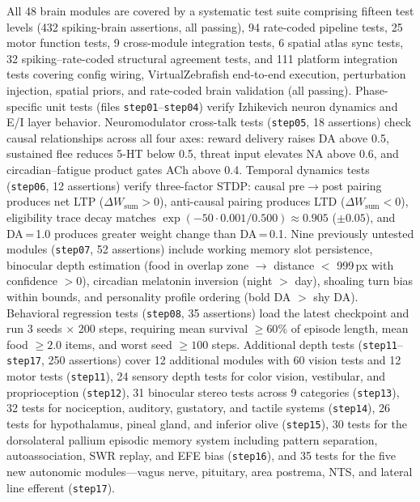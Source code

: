\documentclass[12pt]{article}
\begin{document}
All 48 brain modules are covered by a systematic test suite comprising
fifteen test levels (432 spiking-brain assertions, all passing),
94 rate-coded pipeline tests, 25 motor function tests,
9 cross-module integration tests, 6 spatial atlas sync tests,
32 spiking--rate-coded structural agreement tests,
and 111 platform integration tests covering config wiring,
VirtualZebrafish end-to-end execution, perturbation injection,
spatial priors, and rate-coded brain validation (all passing).
Phase-specific unit tests (files \texttt{step01}--\texttt{step04}) verify
Izhikevich neuron dynamics and E/I layer behavior.
Neuromodulator cross-talk tests (\texttt{step05}, 18 assertions) check
causal relationships across all four axes: reward delivery raises DA
above 0.5, sustained flee reduces 5-HT below 0.5, threat input
elevates NA above 0.6, and circadian--fatigue product gates ACh
above 0.4.
Temporal dynamics tests (\texttt{step06}, 12 assertions) verify
three-factor STDP: causal pre$\to$post pairing produces net LTP
($\Delta W_\text{sum} > 0$), anti-causal pairing produces LTD
($\Delta W_\text{sum} < 0$), eligibility trace decay matches
$\exp(-50 \cdot 0.001 / 0.500) \approx 0.905$ ($\pm 0.05$), and
DA\,=\,1.0 produces greater weight change than DA\,=\,0.1.
Nine previously untested modules (\texttt{step07}, 52 assertions)
include working memory slot persistence, binocular depth estimation
(food in overlap zone $\to$ distance $<$ 999\,px with confidence $> 0$),
circadian melatonin inversion (night $>$ day), shoaling turn bias
within bounds, and personality profile ordering (bold DA $>$ shy DA).
Behavioral regression tests (\texttt{step08}, 35 assertions) load the latest
checkpoint and run 3 seeds $\times$ 200 steps, requiring mean
survival $\ge 60\%$ of episode length, mean food $\ge 2.0$ items,
and worst seed $\ge 100$ steps.
Additional depth tests (\texttt{step11}--\texttt{step17}, 250 assertions)
cover 12 additional modules with 60 vision tests and 12 motor tests
(\texttt{step11}), 24 sensory depth tests for color vision, vestibular,
and proprioception (\texttt{step12}), 31 binocular stereo tests across
9 categories (\texttt{step13}), 32 tests for nociception, auditory,
gustatory, and tactile systems (\texttt{step14}), 26 tests for
hypothalamus, pineal gland, and inferior olive (\texttt{step15}),
30 tests for the dorsolateral pallium episodic memory system
including pattern separation, autoassociation, SWR replay, and
EFE bias (\texttt{step16}), and 35 tests for the five new autonomic
modules---vagus nerve, pituitary, area postrema, NTS, and lateral
line efferent (\texttt{step17}).
\end{document}
